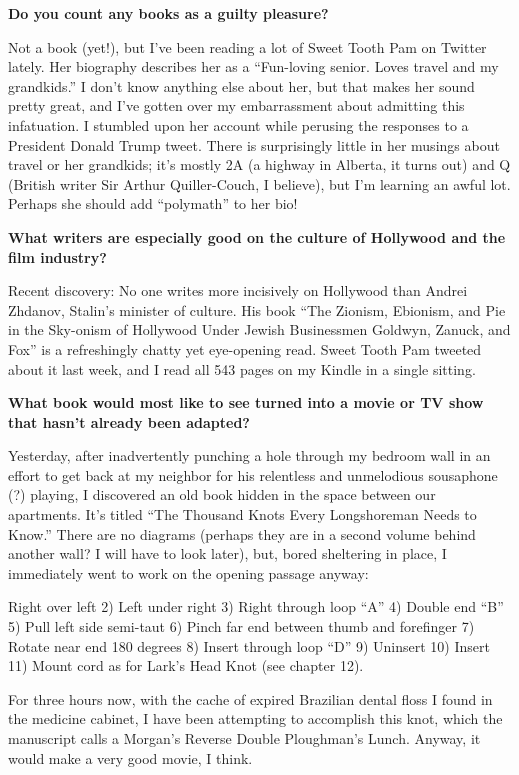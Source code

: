 \textbf{Do you count any books as a guilty pleasure?}

Not a book (yet!), but I've been reading a lot of Sweet Tooth Pam on
Twitter lately. Her biography describes her as a ``Fun-loving senior.
Loves travel and my grandkids.'' I don't know anything else about her,
but that makes her sound pretty great, and I've gotten over my
embarrassment about admitting this infatuation. I stumbled upon her
account while perusing the responses to a President Donald Trump tweet.
There is surprisingly little in her musings about travel or her
grandkids; it's mostly 2A (a highway in Alberta, it turns out) and Q
(British writer Sir Arthur Quiller-Couch, I believe), but I'm learning
an awful lot. Perhaps she should add ``polymath'' to her bio!

\textbf{What writers are especially good on the culture of Hollywood and
the film industry?}

Recent discovery: No one writes more incisively on Hollywood than Andrei
Zhdanov, Stalin's minister of culture. His book ``The Zionism, Ebionism,
and Pie in the Sky-onism of Hollywood Under Jewish Businessmen Goldwyn,
Zanuck, and Fox'' is a refreshingly chatty yet eye-opening read. Sweet
Tooth Pam tweeted about it last week, and I read all 543 pages on my
Kindle in a single sitting.

\textbf{What book would most like to see turned into a movie or TV show
that hasn't already been adapted?}

Yesterday, after inadvertently punching a hole through my bedroom wall
in an effort to get back at my neighbor for his relentless and
unmelodious sousaphone (?) playing, I discovered an old book hidden in
the space between our apartments. It's titled ``The Thousand Knots Every
Longshoreman Needs to Know.'' There are no diagrams (perhaps they are in
a second volume behind another wall? I will have to look later), but,
bored sheltering in place, I immediately went to work on the opening
passage anyway:

Right over left 2) Left under right 3) Right through loop ``A'' 4)
Double end ``B'' 5) Pull left side semi-taut 6) Pinch far end between
thumb and forefinger 7) Rotate near end 180 degrees 8) Insert through
loop ``D'' 9) Uninsert 10) Insert 11) Mount cord as for Lark's Head Knot
(see chapter 12).

For three hours now, with the cache of expired Brazilian dental floss I
found in the medicine cabinet, I have been attempting to accomplish this
knot, which the manuscript calls a Morgan's Reverse Double Ploughman's
Lunch. Anyway, it would make a very good movie, I think.

